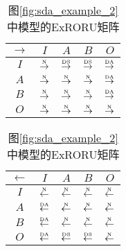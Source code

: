 \begin{table}[htbp]
  \begin{subtable}{1\textwidth}
    \vspace{1em}
    \centering
    \caption{图\ref{fig:sda_example_2}中模型的ExRORU矩阵}
    \label{tab:sda_example_2_matrix}
    \begin{minipage}[b]{0.3\textwidth}
      \centering
      \begin{tabular}{|c|c|c|c|c|} \hline
        $\rightarrow$ & $I$ & $A$ & $B$ & $O$\\ \hline
        $I$ & $\overset{\text{\tiny{N}}}{\rightarrow}$ & $\overset{\text{\tiny{DS}}}{\rightarrow}$ & $\overset{\text{\tiny{DS}}}{\rightarrow}$ & \cellcolor{lightgray}$\overset{\text{\tiny{DA}}}{\rightarrow}$\\ \hline
        $A$ & $\overset{\text{\tiny{N}}}{\rightarrow}$ & $\overset{\text{\tiny{N}}}{\rightarrow}$ & $\overset{\text{\tiny{N}}}{\rightarrow}$ & $\overset{\text{\tiny{DA}}}{\rightarrow}$\\ \hline
        $B$ & $\overset{\text{\tiny{N}}}{\rightarrow}$ & $\overset{\text{\tiny{N}}}{\rightarrow}$ & $\overset{\text{\tiny{N}}}{\rightarrow}$ & $\overset{\text{\tiny{DA}}}{\rightarrow}$\\ \hline
        $O$ & $\overset{\text{\tiny{N}}}{\rightarrow}$ & $\overset{\text{\tiny{N}}}{\rightarrow}$ & $\overset{\text{\tiny{N}}}{\rightarrow}$ & $\overset{\text{\tiny{N}}}{\rightarrow}$\\ \hline
      \end{tabular}
    \end{minipage}
    \begin{minipage}[b]{0.3\textwidth}
      \centering
      \begin{tabular}{|c|c|c|c|c|} \hline
        $\leftarrow$ & $I$ & $A$ & $B$ & $O$\\ \hline
        $I$ & $\overset{\text{\tiny{N}}}{\leftarrow}$ & $\overset{\text{\tiny{N}}}{\leftarrow}$ & $\overset{\text{\tiny{N}}}{\leftarrow}$ & $\overset{\text{\tiny{N}}}{\leftarrow}$\\ \hline
        $A$ & $\overset{\text{\tiny{DA}}}{\leftarrow}$ & $\overset{\text{\tiny{N}}}{\leftarrow}$ & $\overset{\text{\tiny{N}}}{\leftarrow}$ & $\overset{\text{\tiny{N}}}{\leftarrow}$\\ \hline
        $B$ & $\overset{\text{\tiny{DA}}}{\leftarrow}$ & $\overset{\text{\tiny{N}}}{\leftarrow}$ & $\overset{\text{\tiny{N}}}{\leftarrow}$ & $\overset{\text{\tiny{N}}}{\leftarrow}$\\ \hline
        $O$ & \cellcolor{lightgray}$\overset{\text{\tiny{DA}}}{\leftarrow}$ & $\overset{\text{\tiny{DS}}}{\leftarrow}$ & $\overset{\text{\tiny{DS}}}{\leftarrow}$ & $\overset{\text{\tiny{N}}}{\leftarrow}$\\ \hline

\end{tabular}
\end{minipage}
\end{subtable}
\end{table}
